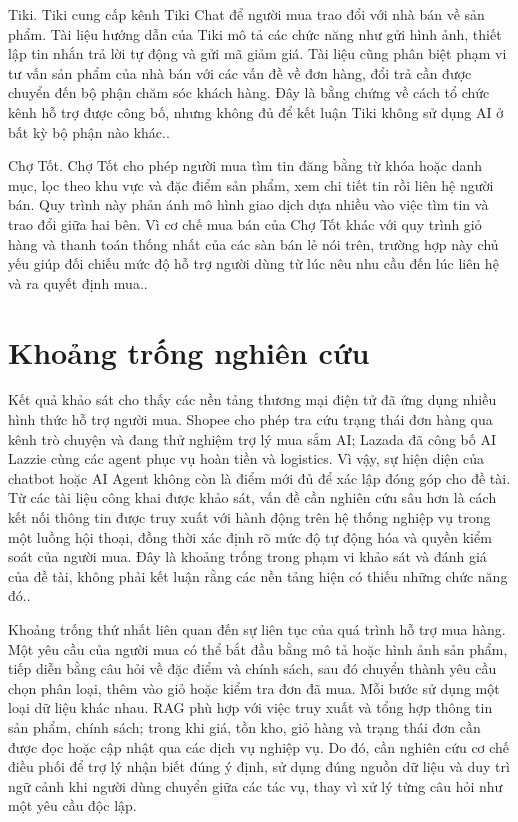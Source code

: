 \documentclass[12pt,a4paper,oneside]{report}
\begin{document}
Tiki. Tiki cung cấp kênh Tiki Chat để người mua trao đổi với nhà bán về sản phẩm. Tài liệu hướng dẫn của Tiki mô tả các chức năng như gửi hình ảnh, thiết lập tin nhắn trả lời tự động và gửi mã giảm giá. Tài liệu cũng phân biệt phạm vi tư vấn sản phẩm của nhà bán với các vấn đề về đơn hàng, đổi trả cần được chuyển đến bộ phận chăm sóc khách hàng. Đây là bằng chứng về cách tổ chức kênh hỗ trợ được công bố, nhưng không đủ để kết luận Tiki không sử dụng AI ở bất kỳ bộ phận nào khác.. \cite{tikichat}

Chợ Tốt. Chợ Tốt cho phép người mua tìm tin đăng bằng từ khóa hoặc danh mục, lọc theo khu vực và đặc điểm sản phẩm, xem chi tiết tin rồi liên hệ người bán. Quy trình này phản ánh mô hình giao dịch dựa nhiều vào việc tìm tin và trao đổi giữa hai bên. Vì cơ chế mua bán của Chợ Tốt khác với quy trình giỏ hàng và thanh toán thống nhất của các sàn bán lẻ nói trên, trường hợp này chủ yếu giúp đối chiếu mức độ hỗ trợ người dùng từ lúc nêu nhu cầu đến lúc liên hệ và ra quyết định mua.. \cite{chototsearch}

\section{Khoảng trống nghiên cứu}
Kết quả khảo sát cho thấy các nền tảng thương mại điện tử đã ứng dụng nhiều hình thức hỗ trợ người mua. Shopee cho phép tra cứu trạng thái đơn hàng qua kênh trò chuyện và đang thử nghiệm trợ lý mua sắm AI; Lazada đã công bố AI Lazzie cùng các agent phục vụ hoàn tiền và logistics. Vì vậy, sự hiện diện của chatbot hoặc AI Agent không còn là điểm mới đủ để xác lập đóng góp cho đề tài. Từ các tài liệu công khai được khảo sát, vấn đề cần nghiên cứu sâu hơn là cách kết nối thông tin được truy xuất với hành động trên hệ thống nghiệp vụ trong một luồng hội thoại, đồng thời xác định rõ mức độ tự động hóa và quyền kiểm soát của người mua. Đây là khoảng trống trong phạm vi khảo sát và đánh giá của đề tài, không phải kết luận rằng các nền tảng hiện có thiếu những chức năng đó.. \cite{shopeeorder,sea2026,lazada2025}

Khoảng trống thứ nhất liên quan đến sự liên tục của quá trình hỗ trợ mua hàng. Một yêu cầu của người mua có thể bắt đầu bằng mô tả hoặc hình ảnh sản phẩm, tiếp diễn bằng câu hỏi về đặc điểm và chính sách, sau đó chuyển thành yêu cầu chọn phân loại, thêm vào giỏ hoặc kiểm tra đơn đã mua. Mỗi bước sử dụng một loại dữ liệu khác nhau. RAG phù hợp với việc truy xuất và tổng hợp thông tin sản phẩm, chính sách; trong khi giá, tồn kho, giỏ hàng và trạng thái đơn cần được đọc hoặc cập nhật qua các dịch vụ nghiệp vụ. Do đó, cần nghiên cứu cơ chế điều phối để trợ lý nhận biết đúng ý định, sử dụng đúng nguồn dữ liệu và duy trì ngữ cảnh khi người dùng chuyển giữa các tác vụ, thay vì xử lý từng câu hỏi như một yêu cầu độc lập.
\end{document}
